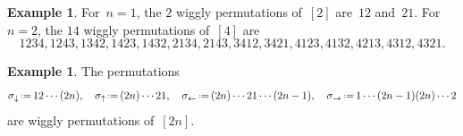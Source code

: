 \documentclass{amsart}
\theoremstyle{definition}
\newtheorem{example}[theorem]{Example}
\newcommand{\eqdef}{\mbox{\,\raisebox{0.2ex}{\scriptsize\ensuremath{\mathrm:}}\ensuremath{=}\,}} %
\begin{document}
\begin{example}
\label{exm:allSmallWigglyPermutations}
For~$n = 1$, the $2$ wiggly permutations of~$[2]$ are~$12$ and~$21$.
For~$n = 2$, the $14$ wiggly permutations of~$[4]$ are
\[
1234, 1243, 1342, 1423, 1432, 2134, 2143, 3412, 3421, 4123, 4132, 4213, 4312, 4321.
\]
\end{example}

\begin{example}
\label{exm:specialWigglyPermutations}
The permutations
\[
\sigma_\downarrow \eqdef 1 2 \cdots (2n),
\quad
\sigma_\uparrow \eqdef (2n) \cdots 2 1,
\quad
\sigma_\leftarrow \eqdef (2n) \cdots 2 1 \cdots (2n-1),
\quad
\sigma_\rightarrow \eqdef 1 \cdots (2n-1) (2n) \cdots 2
\]
are wiggly permutations of~$[2n]$.
\end{example}
\end{document}
